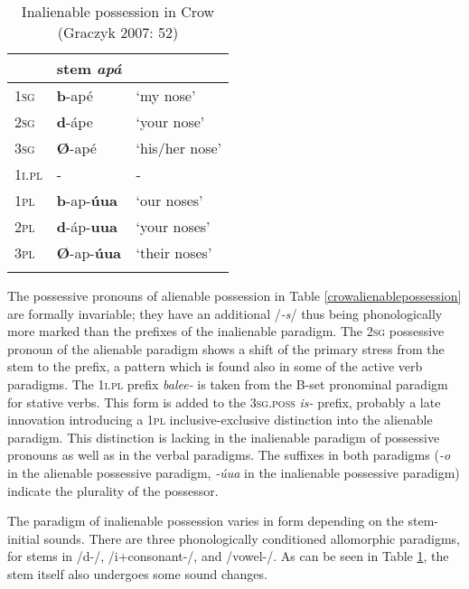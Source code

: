 \documentclass[output=paper]{LSP/langsci}
\begin{document}
\begin{table}
\caption{Inalienable possession in Crow (Graczyk 2007: 52)} \label{crowinalienablepossession}
\begin{tabular}[h!]{ l l l }
\lsptoprule
& stem \textit{apá}  & \\
\midrule	
\textsc{1sg} & \textbf{b}-apé & `my nose' \\
 
\textsc{2sg} & \textbf{d}-ápe	 & `your nose' \\
 
\textsc{3sg} & \textbf{Ø}-apé & `his/her nose' \\
 
\textsc{1i.pl}	& -	& - \\
 
\textsc{1pl} & \textbf{b}-ap-\textbf{úua}	& `our noses' \\
 
\textsc{2pl} & \textbf{d}-áp-\textbf{uua}	& `your noses' \\
 
\textsc{3pl} & \textbf{Ø}-ap-\textbf{úua}	& `their noses' \\
\lspbottomrule
\end{tabular}
\end{table}

The possessive pronouns of alienable possession in Table \ref{crowalienablepossession} are formally invariable; they have an additional /\textit{-s}/ thus being phonologically more marked than the prefixes of the inalienable paradigm. The \textsc{2sg} possessive pronoun of the alienable paradigm shows a shift of the primary stress from the stem to the prefix, a pattern which is found also in some of the active verb paradigms. The \textsc{1i.pl} prefix \textit{balee-} is taken from the B-set pronominal paradigm for stative verbs. This form is added to the \textsc{3sg.poss} \textit{is-} prefix, probably a late innovation introducing a \textsc{1pl} inclusive-exclusive distinction into the alienable paradigm. This distinction is lacking in the inalienable paradigm of possessive pronouns as well as in the verbal paradigms. The suffixes in both paradigms (\textit{-o} in the alienable possessive paradigm, \textit{-úua} in the inalienable possessive paradigm) indicate the plurality of the possessor.

The paradigm of inalienable possession varies in form depending on the stem-initial sounds. There are three phonologically conditioned allomorphic paradigms, for stems in /d-/, /i+consonant-/, and /vowel-/. As can be seen in Table \ref{crowinalienablepossession}, the stem itself also undergoes some sound changes.
\end{document}

